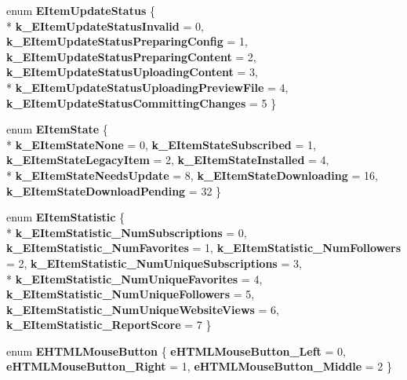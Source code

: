 \begin{DoxyCompactItemize}
\item 
\hypertarget{namespaceValve_1_1Steamworks_a4bcf5422890768c204271d392121fd6e}{}enum {\bfseries E\+Item\+Update\+Status} \{ \\*
{\bfseries k\+\_\+\+E\+Item\+Update\+Status\+Invalid} = 0, 
{\bfseries k\+\_\+\+E\+Item\+Update\+Status\+Preparing\+Config} = 1, 
{\bfseries k\+\_\+\+E\+Item\+Update\+Status\+Preparing\+Content} = 2, 
{\bfseries k\+\_\+\+E\+Item\+Update\+Status\+Uploading\+Content} = 3, 
\\*
{\bfseries k\+\_\+\+E\+Item\+Update\+Status\+Uploading\+Preview\+File} = 4, 
{\bfseries k\+\_\+\+E\+Item\+Update\+Status\+Committing\+Changes} = 5
 \}\label{namespaceValve_1_1Steamworks_a4bcf5422890768c204271d392121fd6e}

\item 
\hypertarget{namespaceValve_1_1Steamworks_a8b19e4b9db4059e82e46a211084bc98f}{}enum {\bfseries E\+Item\+State} \{ \\*
{\bfseries k\+\_\+\+E\+Item\+State\+None} = 0, 
{\bfseries k\+\_\+\+E\+Item\+State\+Subscribed} = 1, 
{\bfseries k\+\_\+\+E\+Item\+State\+Legacy\+Item} = 2, 
{\bfseries k\+\_\+\+E\+Item\+State\+Installed} = 4, 
\\*
{\bfseries k\+\_\+\+E\+Item\+State\+Needs\+Update} = 8, 
{\bfseries k\+\_\+\+E\+Item\+State\+Downloading} = 16, 
{\bfseries k\+\_\+\+E\+Item\+State\+Download\+Pending} = 32
 \}\label{namespaceValve_1_1Steamworks_a8b19e4b9db4059e82e46a211084bc98f}

\item 
\hypertarget{namespaceValve_1_1Steamworks_a8adc0e7157fd68a4d1e1c4d89aeb1b02}{}enum {\bfseries E\+Item\+Statistic} \{ \\*
{\bfseries k\+\_\+\+E\+Item\+Statistic\+\_\+\+Num\+Subscriptions} = 0, 
{\bfseries k\+\_\+\+E\+Item\+Statistic\+\_\+\+Num\+Favorites} = 1, 
{\bfseries k\+\_\+\+E\+Item\+Statistic\+\_\+\+Num\+Followers} = 2, 
{\bfseries k\+\_\+\+E\+Item\+Statistic\+\_\+\+Num\+Unique\+Subscriptions} = 3, 
\\*
{\bfseries k\+\_\+\+E\+Item\+Statistic\+\_\+\+Num\+Unique\+Favorites} = 4, 
{\bfseries k\+\_\+\+E\+Item\+Statistic\+\_\+\+Num\+Unique\+Followers} = 5, 
{\bfseries k\+\_\+\+E\+Item\+Statistic\+\_\+\+Num\+Unique\+Website\+Views} = 6, 
{\bfseries k\+\_\+\+E\+Item\+Statistic\+\_\+\+Report\+Score} = 7
 \}\label{namespaceValve_1_1Steamworks_a8adc0e7157fd68a4d1e1c4d89aeb1b02}

\item 
\hypertarget{namespaceValve_1_1Steamworks_a714b2f68b5016c6d75dfad12f0e0b15e}{}enum {\bfseries E\+H\+T\+M\+L\+Mouse\+Button} \{ {\bfseries e\+H\+T\+M\+L\+Mouse\+Button\+\_\+\+Left} = 0, 
{\bfseries e\+H\+T\+M\+L\+Mouse\+Button\+\_\+\+Right} = 1, 
{\bfseries e\+H\+T\+M\+L\+Mouse\+Button\+\_\+\+Middle} = 2
 \}\label{namespaceValve_1_1Steamworks_a714b2f68b5016c6d75dfad12f0e0b15e}


\end{DoxyCompactItemize}
